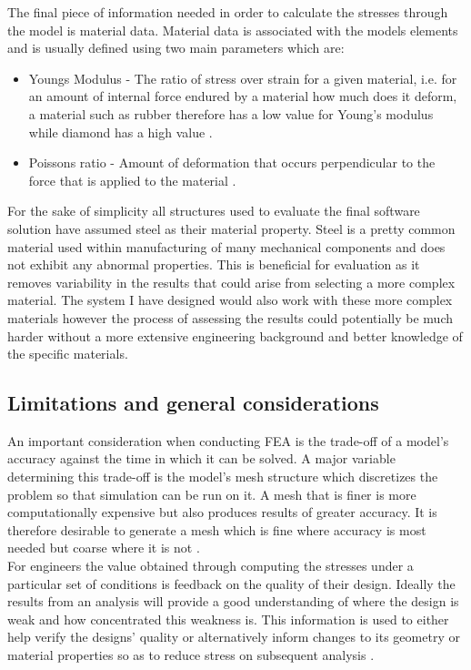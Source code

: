 \noindent
The final piece of information needed in order to calculate the stresses through the model is material data. Material data is associated with the models elements and is usually defined using two main parameters which are:

\begin{itemize}
\item Youngs Modulus - The ratio of stress over strain for a given material, i.e. for an amount of internal force endured by a material how much does it deform, a material such as rubber therefore has a low value for Young's modulus while diamond has a high value \cite{YoungsModulus}.

\item Poissons ratio - Amount of deformation that occurs perpendicular to the force that is applied to the material \cite{PossionsRatio}. 
\end{itemize}

\noindent
For the sake of simplicity all structures used to evaluate the final software solution have assumed steel as their material property. Steel is a pretty common material used within manufacturing of many mechanical components and does not exhibit any abnormal properties. This is beneficial for evaluation as it removes variability in the results that could arise from selecting a more complex material. The system I have designed would also work with these more complex materials however the process of assessing the results could potentially be much harder without a more extensive engineering background and better knowledge of the specific materials. 

\subsection{Limitations and general considerations}
\noindent
An important consideration when conducting FEA is the trade-off of a model's accuracy against the time in which it can be solved. A major variable determining this trade-off is the model's mesh structure which discretizes the problem so that simulation can be run on it. A mesh that is finer is more computationally expensive but also produces results of greater accuracy. It is therefore desirable to generate a mesh which is fine where accuracy is most needed but coarse where it is not \cite{cite04}. \\


\noindent
For engineers the value obtained through computing the stresses under a particular set of conditions is feedback on the quality of their design. Ideally the results from an analysis will provide a good understanding of where the design is weak and how concentrated this weakness is. This information is used to either help verify the designs' quality or alternatively inform changes to its geometry or material properties so as to reduce stress on subsequent analysis \cite{cite06}.\\

